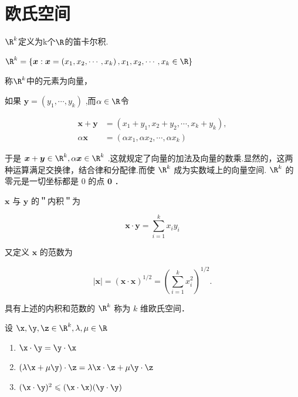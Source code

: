\section{欧氏空间}
\begin{definition}
	$\R^k$定义为k个$\R$的笛卡尔积.
	
	$\R^k=\left\{\boldsymbol{x}:\boldsymbol{x}=\left(x_1, x_2, \cdots, x_k\right),x_1,x_2,\cdots,x_k\in\R\right\}$
	
	称$\R^k$中的元素为向量，
	
	如果  $\boldsymbol{y}=\left(y_1, \cdots, y_k\right)$ 
	,而$\alpha\in\R$令
	
	$$
	\begin{aligned}
		\boldsymbol{x}+\boldsymbol{y} & =\left(x_1+y_1, x_2+y_2, \cdots, x_k+y_k\right), \\
		\alpha \boldsymbol{x} & =\left(\alpha x_1, \alpha x_2, \cdots, \alpha x_k\right)
	\end{aligned}
	$$
	
	
	于是 $\boldsymbol{x}+\boldsymbol{y}\in \R^k, \alpha \boldsymbol{x} \in \R^k$ .这就规定了向量的加法及向量的数乘.显然的，这两种运算满足交换律，结合律和分配律.而使 $\R^k$ 成为实数域上的向量空间. $\R^k$ 的零元是一切坐标都是 0 的点 $\mathbf{0}$ ．
\end{definition}
\begin{definition}
	$\boldsymbol{x}$ 与 $\boldsymbol{y}$ 的＂内积＂为
	
	$$
	\boldsymbol{x} \cdot \boldsymbol{y}=\sum_{i=1}^k x_i y_i
	$$
	
	
	又定义 $\boldsymbol{x}$ 的范数为
	
	$$
	|\boldsymbol{x}|=(\boldsymbol{x} \cdot \boldsymbol{x})^{1 / 2}=\left(\sum_{i=1}^k x_i^2\right)^{1 / 2} .
	$$
\end{definition}
具有上述的内积和范数的 $\R^k$ 称为 $k$ 维欧氏空间．
\begin{proposition}设 $\x, \y, \z \in \R^k, \lambda, \mu \in \R$
	\begin{enumerate}
		\item $\x\cdot\y=\y\cdot\x$
		\item $(\lambda\x+\mu\y)\cdot\z=\lambda\x\cdot\z+\mu\y\cdot\z$
		\item $(\x\cdot\y)^2\leqslant(\x\cdot\x)(\y\cdot\y)$
		
	\end{enumerate}
\end{proposition}
